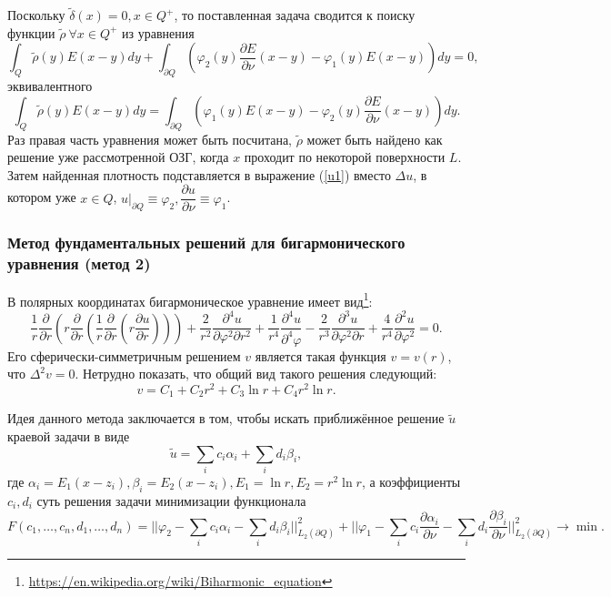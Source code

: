\documentclass[a4paper, 12pt]{article}
\newcommand{\der}[2]{\dfrac{\partial #1}{\partial #2}}
\begin{document}
Поскольку $\tilde{\delta}(x)=0, x \in Q^+$, то поставленная задача сводится к поиску функции $\tilde{\rho}\ \forall x \in Q^+$ из уравнения
\begin{equation}
    \int_Q \tilde{\rho}(y) E(x-y) dy + \int_{\partial Q} \left(\varphi_2(y)\der{E}{\nu}(x-y)-\varphi_1(y) E(x-y) \right) dy=0,
\end{equation} 
эквивалентного 
\begin{equation}
    \int_Q \tilde{\rho}(y) E(x-y) dy = \int_{\partial Q} \left(\varphi_1(y) E(x-y) -\varphi_2(y)\der{E}{\nu}(x-y)\right) dy.
    \label{bgogz}
\end{equation} 
Раз правая часть уравнения может быть посчитана, $\tilde{\rho}$ может быть найдено как решение уже рассмотренной ОЗГ, когда $x$ проходит по некоторой поверхности $L$.
Затем найденная плотность подставляется в выражение (\ref{u1}) вместо $\Delta u$, в котором уже $x \in Q$, $u|_{\partial Q} \equiv \varphi_2, \der{u}{\nu} \equiv \varphi_1$.

\subsubsection{Метод фундаментальных решений для бигармонического уравнения (метод 2)}

В полярных координатах бигармоническое уравнение имеет вид\footnote{\url{https://en.wikipedia.org/wiki/Biharmonic_equation}}:
\begin{equation}
  \dfrac{1}{r} \dfrac{\partial}{\partial r} \left(r \dfrac{\partial}{\partial r} \left( \dfrac{1}{r} \dfrac{\partial}{\partial r} \left(r \dfrac{\partial u}{\partial r}   \right)  \right)    \right) + \dfrac{2}{r^2} \dfrac{\partial^4 u}{\partial \varphi^2 \partial r^2} +\dfrac{1}{r^4} \dfrac{\partial^4 u}{\partial^4 \varphi} - \dfrac{2}{r^3} \dfrac{\partial^3 u}{\partial \varphi^2 \partial r} + \dfrac{4}{r^4} \dfrac{\partial^2 u}{\partial \varphi^2}=0.  
\end{equation}
Его сферически-симметричным решением $v$ является такая функция $v=v(r)$, что $\Delta^2 v=0$.
Нетрудно показать, что общий вид такого решения следующий:
\begin{equation*}
  v = C_1 + C_2 r^2 + C_3 \ln r + C_4 r^2 \ln r.
\end{equation*}

Идея данного метода заключается в том, чтобы искать приближённое решение $\tilde{u}$ краевой задачи в виде
\begin{equation*}
  \tilde{u} = \sum_i c_i \alpha_i + \sum_i d_i \beta_i,
\end{equation*}
где $\alpha_i=E_1(x-z_i), \beta_i = E_2(x-z_i), E_1=\ln r, E_2= r^2 \ln r$, а коэффициенты $c_i, d_i$ суть решения задачи минимизации функционала
\begin{equation*}
  F(c_1,\dots,c_n,d_1,\dots,d_n)= \biggl|\biggl|\varphi_2 -\sum_i c_i \alpha_i-\sum_i d_i \beta_i   \biggl|\biggl|_{L_2(\partial Q)}^2+\biggl|\biggl|\varphi_1 -\sum_i c_i \dfrac{\partial \alpha_i}{\partial \nu} -\sum_i d_i \dfrac{\partial \beta_i }{\partial \nu}   \biggl|\biggl|_{L_2(\partial Q)}^2 \rightarrow \min .
\end{equation*}
\end{document}
